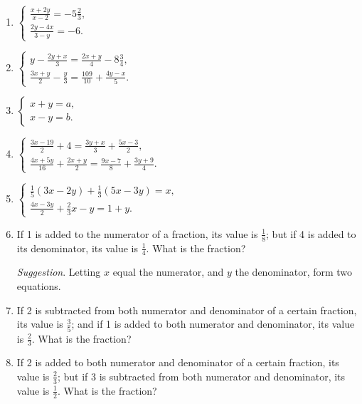 \documentclass{book}
\begin{document}
\begin{enumerate}
\item $\left\{ \begin{matrix}\frac{x + 2y}{x - 2} = -5\frac{2}{3},
\\ \frac{2y - 4x}{3 - y} = -6.\end{matrix}\right.$

\item $\left\{ \begin{matrix}y - \frac{2y + x}{3} = \frac{2x + y}{4} - 8\frac{3}{4}, \\ \frac{3x + y}{2} - \frac{y}{3} = \frac{109}{10} + \frac{4y - x}{5}.\end{matrix}\right.$

\item $\left\{ \begin{matrix}x + y = a, \\ x - y = b.\end{matrix}\right.$

\item $\left\{ \begin{matrix}\frac{3x - 19}{2} + 4 = \frac{3y + x}{3} + \frac{5x - 3}{2}, \\ \frac{4x + 5y}{16} + \frac{2x + y}{2} = \frac{9x - 7}{8} + \frac{3y + 9}{4}.\end{matrix}\right.$

\item $\left\{ \begin{matrix}\frac{1}{5}(3x - 2y) + \frac{1}{3}(5x - 3y) = x, \\ \frac{4x - 3y}{2} + \frac{2}{3}x - y = 1 + y.\end{matrix}\right.$

\item If 1 is added to the numerator of a fraction, its
value is $\frac{1}{8}$; but if 4 is added to its denominator, its value
is $\frac{1}{4}$. What is the fraction?

\textit{ Suggestion}. Letting $x$ equal the numerator, and $y$ the
denominator, form two equations.

\item If 2 is subtracted from both numerator and denominator
of a certain fraction, its value is $\frac{3}{5}$; and if 1 is
added to both numerator and denominator, its value is $\frac{2}{3}$.
What is the fraction?

\item If 2 is added to both numerator and denominator of
a certain fraction, its value is $\frac{2}{3}$; but if 3 is subtracted
from both numerator and denominator, its value is $\frac{1}{2}$.
What is the fraction?


\end{enumerate}
\end{document}
